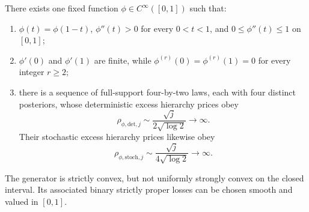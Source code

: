 \begin{theorem}
\label{thm:smooth-bounded-slope}
There exists one fixed function $\phi\in C^\infty([0,1])$ such that:
\begin{enumerate}
\item $\phi(t)=\phi(1-t)$, $\phi''(t)>0$ for every $0<t<1$, and
      $0\leq\phi''(t)\leq1$ on $[0,1]$;
\item $\phi'(0)$ and $\phi'(1)$ are finite, while
      $\phi^{(r)}(0)=\phi^{(r)}(1)=0$ for every integer $r\geq2$;
\item there is a sequence of full-support four-by-two laws, each with
      four distinct posteriors, whose deterministic excess hierarchy
      prices obey
      \[
       \rho_{\phi,\mathrm{det},j}\sim
       \frac{\sqrt j}{2\sqrt{\log2}}\longrightarrow\infty.
      \]
      Their stochastic excess hierarchy prices likewise obey
      \[
       \rho_{\phi,\mathrm{stoch},j}\sim
       \frac{\sqrt j}{4\sqrt{\log2}}\longrightarrow\infty.
      \]
\end{enumerate}
The generator is strictly convex, but not uniformly strongly convex on
the closed interval.  Its associated binary strictly proper losses can
be chosen smooth and valued in $[0,1]$.
\end{theorem}

